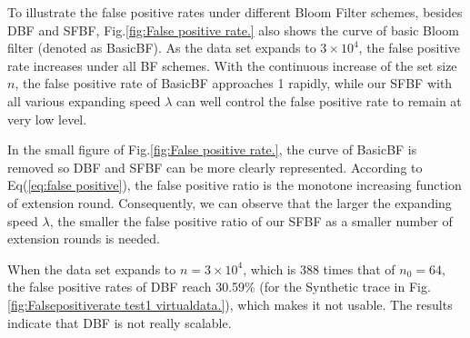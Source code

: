 \documentclass[10pt,journal,letterpaper]{IEEEtran}
\newcommand{\rev}[1]{#1}
\newcommand{\note}[1]{{\sffamily\itshape\bfseries\uline{#1}}}
\begin{document}
To illustrate the false positive rates under different Bloom Filter schemes, besides DBF and SFBF, Fig.\ref{fig:False positive rate.} also shows the curve of basic Bloom filter (denoted as BasicBF). As the data set expands to $3 \times 10^4$, the false positive rate increases under all BF schemes. With the continuous increase of the set size $n$, the false positive rate of BasicBF approaches 1 rapidly, while our SFBF with all various expanding speed $\lambda$ can well control the false positive rate to remain at very low level.

In the small figure of Fig.\ref{fig:False positive rate.}, the curve of BasicBF is removed so DBF and SFBF can be more clearly represented. \rev{According to Eq(\ref{eq:false positive}), the false positive ratio is the monotone increasing function of extension round.  Consequently,} we can observe that the larger the expanding speed $\lambda$, the smaller the false positive ratio of our SFBF as a smaller number of extension rounds is needed.



When the data set expands to $n = 3 \times 10^4$, which is 388 times that of $n_0= 64$, the false positive rates of DBF reach 30.59\% (for the Synthetic trace in Fig.\ref{fig:Falsepositiverate test1 virtualdata.}),
   which makes it not usable. The results indicate that DBF is not really scalable.
\end{document}
